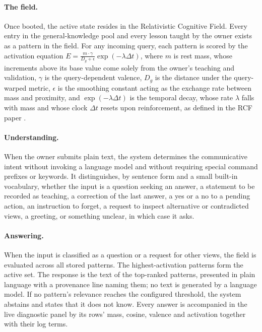 \documentclass[11pt]{article}
\theoremstyle{remark}
\newcommand{\act}{E}
\newcommand{\dist}{D_g}
\begin{document}
\paragraph{The field.}
Once booted, the active state resides in the Relativistic Cognitive Field. Every entry in the general-knowledge pool and every lesson taught by the owner exists as a pattern in the field. For any incoming query, each pattern is scored by the activation equation $\act = \frac{m \cdot \gamma}{\dist + \epsilon} \exp(-\lambda \Delta t)$, where $m$ is rest mass, whose increments above its base value come solely from the owner's teaching and validation, $\gamma$ is the query-dependent valence, $\dist$ is the distance under the query-warped metric, $\epsilon$ is the smoothing constant acting as the exchange rate between mass and proximity, and $\exp(-\lambda \Delta t)$ is the temporal decay, whose rate $\lambda$ falls with mass and whose clock $\Delta t$ resets upon reinforcement, as defined in the RCF paper \cite{balgurov2026rcf}.

\paragraph{Understanding.}
When the owner submits plain text, the system determines the communicative intent without invoking a language model and without requiring special command prefixes or keywords. It distinguishes, by sentence form and a small built-in vocabulary, whether the input is a question seeking an answer, a statement to be recorded as teaching, a correction of the last answer, a yes or a no to a pending action, an instruction to forget, a request to inspect alternative or contradicted views, a greeting, or something unclear, in which case it asks.

\paragraph{Answering.}
When the input is classified as a question or a request for other views, the field is evaluated across all stored patterns. The highest-activation patterns form the active set. The response is the text of the top-ranked patterns, presented in plain language with a provenance line naming them; no text is generated by a language model. If no pattern's relevance reaches the configured threshold, the system abstains and states that it does not know. Every answer is accompanied in the live diagnostic panel by its rows' mass, cosine, valence and activation together with their log terms.
\end{document}
